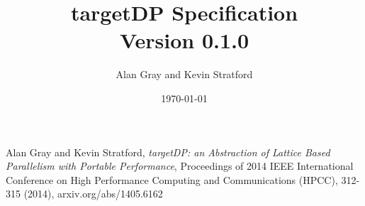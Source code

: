 \documentclass[10pt]{report}
\title{targetDP Specification \\ Version 0.1.0}
\author{Alan Gray and Kevin Stratford}
\date{\today}
\begin{document}
\pagestyle{empty}
\maketitle

\pagestyle{fancy}
\tableofcontents


\linenumbers







\begin{thebibliography}{}
 Alan Gray and Kevin Stratford, {\it targetDP: an Abstraction of Lattice Based Parallelism with Portable Performance}, Proceedings of 2014 IEEE International Conference on High Performance Computing and Communications (HPCC), 312-315 (2014),  arxiv.org/abs/1405.6162 
\end{thebibliography}{}
\end{document}
